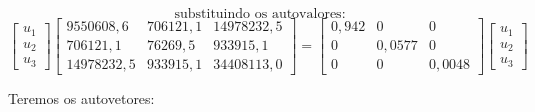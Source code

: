 \documentclass[
]{book}
\begin{document}
\[\mbox{substituindo os autovalores:}\]
\[\begin{bmatrix}
u_1\\ u_2 \\ u_3
\end{bmatrix}
\begin{bmatrix}
9550608,6  &706121,1 &14978232,5\\ 
706121,1 &76269,5 & 933915,1 \\
14978232,5&933915,1&34408113,0
\end{bmatrix}  = \begin{bmatrix}0,942&0&0 \\ 0&0,0577&0 \\0&0& 0,0048 \end{bmatrix}\begin{bmatrix}
u_1\\ u_2 \\ u_3
\end{bmatrix}\]

Teremos os autovetores:
\end{document}
